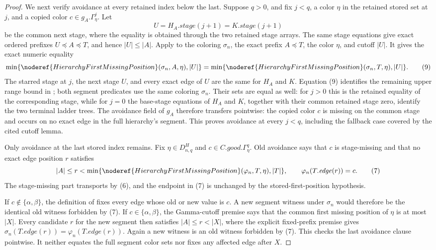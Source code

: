 \begin{proof}
We next verify avoidance at every retained index below the last.  Suppose
\(q>0\), and fix \(j<q\), a color \(\eta\) in the retained stored set at
\(j\), and a copied color \(c\in g_A.\Gamma^j_\eta\).  Let
\[
 U=H_A.\mathit{stage}(j+1)=K.\mathit{stage}(j+1)                 \tag{8}
\]
be the common next stage, where the equality is obtained through the two
retained stage arrays.  The same stage equations give exact ordered
prefixes \(U\preccurlyeq A\preccurlyeq T\), and hence \(|U|\leq|A|\).
Apply  to the coloring
\(\sigma_n\), the exact prefix \(A\preccurlyeq T\), the color \(\eta\),
and cutoff \(|U|\).  It gives the exact numeric equality
\[
 \min\{\noderef{HierarchyFirstMissingPosition}(\sigma_n,A,\eta),|U|\}
 =
 \min\{\noderef{HierarchyFirstMissingPosition}(\sigma_n,T,\eta),|U|\}.
                                                                    \tag{9}
\]
The starred stage at \(j\), the next stage \(U\), and every exact edge
of \(U\) are the same for \(H_A\) and \(K\).  Equation (9) identifies
the remaining upper range bound in
; both segment predicates use the same
coloring \(\sigma_n\).  Their
 sets are equal as well: for
\(j>0\) this is the retained equality of the corresponding stage, while
for \(j=0\) the base-stage equations of \(H_A\) and \(K\), together with
their common retained stage zero, identify the two terminal ladder
trees.  The avoidance field of \(g_A\) therefore transfers pointwise:
the copied color \(c\) is missing on the common stage and occurs on no
exact edge in the full hierarchy's segment.  This proves avoidance at
every \(j<q\), including the fallback case covered by the cited cutoff
lemma.

Only avoidance at the last stored index remains.  Fix
\(\eta\in D^H_{n,q}\) and
\(c\in C.\mathit{good}.\Gamma^q_\eta\).  Old avoidance says that \(c\)
is stage-missing and that no exact edge position \(r\) satisfies
\[
 |A|\le r<
 \min\{\noderef{HierarchyFirstMissingPosition}
          (\varphi_n,T,\eta),|T|\},
 \qquad \varphi_n(T.\mathit{edge}(r))=c.                    \tag{7}
\]
The stage-missing part transports by (6), and the endpoint in (7) is
unchanged by the stored-first-position hypothesis.

If \(c\notin\{\alpha,\beta\}\), the definition of
 fixes every edge whose old or new value
is \(c\).  A new segment witness under \(\sigma_n\) would therefore be
the identical old witness forbidden by (7).  If
\(c\in\{\alpha,\beta\}\), the Gamma-cutoff premise says that the common
first missing position of \(\eta\) is at most \(|X|\).  Every candidate
\(r\) for the new segment then satisfies
\(|A|\le r<|X|\), where the explicit fixed-prefix premise gives
\(\sigma_n(T.\mathit{edge}(r))=\varphi_n(T.\mathit{edge}(r))\).
Again a new witness is an old witness forbidden by (7).  This checks the
last avoidance clause pointwise.  It neither equates the full segment
color sets nor fixes any affected edge after \(X\).


\end{proof}
